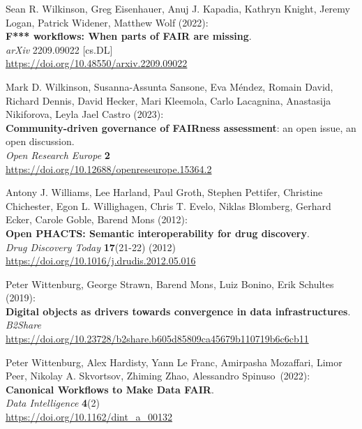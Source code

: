 \begin{thebibliography}{9}
Sean R. Wilkinson, Greg Eisenhauer, Anuj J. Kapadia, Kathryn Knight,
Jeremy Logan, Patrick Widener, Matthew Wolf (2022): \\
\textbf{F*** workflows: When parts of {FAIR} are missing}. \\
\emph{arXiv} 2209.09022 [cs.DL] \\
\url{https://doi.org/10.48550/arxiv.2209.09022}

Mark D. Wilkinson, Susanna-Assunta Sansone, Eva Méndez, Romain David, Richard Dennis, David Hecker, Mari Kleemola, Carlo Lacagnina, Anastasija Nikiforova, Leyla Jael Castro (2023):\\
\textbf{Community-driven governance of FAIRness assessment}: an open issue, an open discussion.\\
\emph{Open Research Europe} \textbf{2}\\
\url{https://doi.org/10.12688/openreseurope.15364.2}

Antony J. Williams, Lee Harland, Paul Groth, Stephen Pettifer, Christine
Chichester, Egon L. Willighagen, Chris T. Evelo, Niklas Blomberg,
Gerhard Ecker, Carole Goble, Barend Mons (2012): \\
\textbf{Open {PHACTS}: Semantic interoperability for drug discovery}.\\
\emph{Drug Discovery Today} \textbf{17}(21-22) (2012) \\
\url{https://doi.org/10.1016/j.drudis.2012.05.016}

Peter Wittenburg, George Strawn, Barend Mons, Luiz Bonino, Erik
Schultes (2019): \\
\textbf{Digital objects as drivers towards convergence in data
infrastructures}. \\
\emph{B2Share}\\
\url{https://doi.org/10.23728/b2share.b605d85809ca45679b110719b6c6cb11}

Peter Wittenburg, Alex Hardisty, Yann Le Franc, Amirpasha Mozaffari, Limor Peer, Nikolay A. Skvortsov, Zhiming Zhao, Alessandro Spinuso~(2022):\\
\textbf{Canonical Workflows to Make Data FAIR}.\\
\emph{Data Intelligence} \textbf{4}(2)\\
\url{https://doi.org/10.1162/dint_a_00132}


\end{thebibliography}
